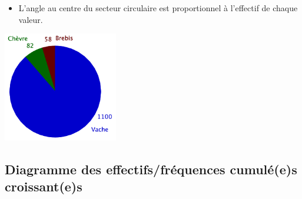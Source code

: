 \begin{multicols}{2}
  \begin{itemize}
  \item L'angle au centre du secteur circulaire est proportionnel à l'effectif
    de chaque valeur.
  \end{itemize}
  
  \medskip
  
  \columnbreak
  \begin{minipage}{1.0\linewidth}
    \vspace{-2em}
    \begin{center}
      \includegraphics[width=5cm]{Stats_Fig4_DiagCirc}
    \end{center}    
  \end{minipage}
\end{multicols}



\subsection{Diagramme des effectifs/fréquences cumulé(e)s croissant(e)s}


